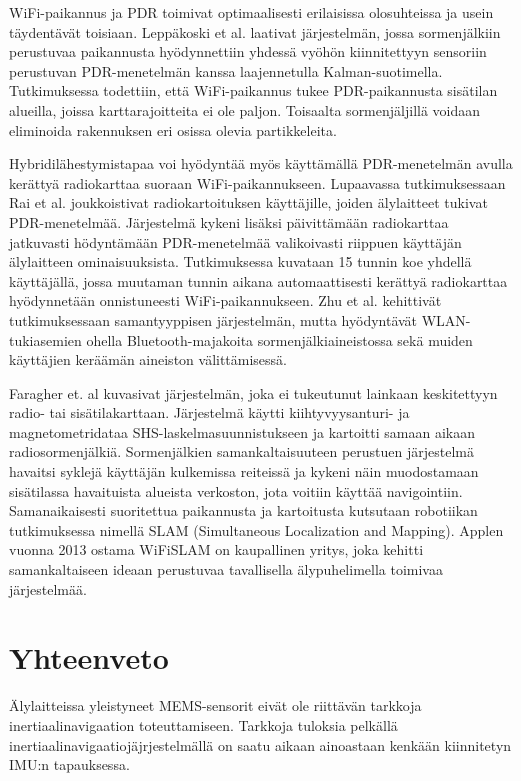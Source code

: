 WiFi-paikannus ja PDR toimivat optimaalisesti erilaisissa olosuhteissa ja usein
täydentävät toisiaan.  Leppäkoski et al. \cite{leppakoski2013} laativat
järjestelmän, jossa sormenjälkiin perustuvaa paikannusta hyödynnettiin yhdessä
vyöhön kiinnitettyyn sensoriin perustuvan PDR-menetelmän kanssa laajennetulla
Kalman-suotimella. Tutkimuksessa todettiin, että WiFi-paikannus tukee
PDR-paikannusta sisätilan alueilla, joissa karttarajoitteita ei ole paljon.
Toisaalta sormenjäljillä voidaan eliminoida rakennuksen eri osissa olevia
partikkeleita.

Hybridilähestymistapaa voi hyödyntää myös käyttämällä PDR-menetelmän avulla
kerättyä radiokarttaa suoraan WiFi-paikannukseen. Lupaavassa tutkimuksessaan
Rai et al. \cite{rai2012} joukkoistivat radiokartoituksen käyttäjille, joiden
älylaitteet tukivat PDR-menetelmää. Järjestelmä kykeni lisäksi päivittämään
radiokarttaa jatkuvasti hödyntämään PDR-menetelmää valikoivasti riippuen
käyttäjän älylaitteen ominaisuuksista. Tutkimuksessa kuvataan 15 tunnin koe
yhdellä käyttäjällä, jossa muutaman tunnin aikana automaattisesti kerättyä
radiokarttaa hyödynnetään onnistuneesti WiFi-paikannukseen. Zhu et al.
\cite{zhu2012} kehittivät tutkimuksessaan samantyyppisen järjestelmän, mutta
hyödyntävät WLAN-tukiasemien ohella Bluetooth-majakoita sormenjälkiaineistossa
sekä muiden käyttäjien keräämän aineiston välittämisessä.

Faragher et. al \cite{faragher2012} kuvasivat järjestelmän, joka ei tukeutunut
lainkaan keskitettyyn radio- tai sisätilakarttaan. Järjestelmä käytti
kiihtyvyysanturi- ja magnetometridataa SHS-laskelmasuunnistukseen ja kartoitti
samaan aikaan radiosormenjälkiä. Sormenjälkien samankaltaisuuteen perustuen
järjestelmä havaitsi syklejä käyttäjän kulkemissa reiteissä ja kykeni näin
muodostamaan sisätilassa havaituista alueista verkoston, jota voitiin käyttää
navigointiin. Samanaikaisesti suoritettua paikannusta ja kartoitusta kutsutaan
robotiikan tutkimuksessa nimellä SLAM (Simultaneous Localization and Mapping).
Applen vuonna 2013 ostama WiFiSLAM on kaupallinen yritys, joka kehitti
samankaltaiseen ideaan perustuvaa tavallisella älypuhelimella toimivaa
järjestelmää.

\section{Yhteenveto}

Älylaitteissa yleistyneet MEMS-sensorit eivät ole riittävän tarkkoja
inertiaalinavigaation toteuttamiseen. Tarkkoja tuloksia pelkällä
inertiaalinavigaatiojäjrjestelmällä on saatu aikaan ainoastaan kenkään
kiinnitetyn IMU:n tapauksessa.

